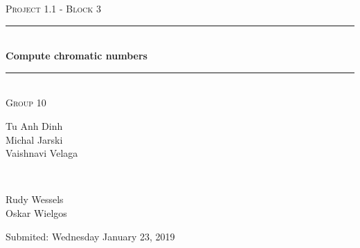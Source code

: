 \documentclass[a4paper]{report}
\begin{document}
	\begin{titlepage} 
		\newcommand{\HRule}{\rule{\linewidth}{0.5mm}}
		
		\center 
		
		\textsc{\large Project 1.1 - Block 3}\\[0.5cm] 
		
		\HRule\\[0.4cm]
		
		{\huge\bfseries Compute chromatic numbers}\\[0.4cm] 
		
		\HRule\\[1.5cm]
		
		\textsc{\large Group 10}\\[0.5cm]

		\begin{minipage}{0.6\textwidth}
			\begin{flushleft}
				Tu Anh Dinh\\Michal Jarski\\Vaishnavi Velaga
			\end{flushleft}
		\end{minipage}
		~
		\begin{minipage}{0.3\textwidth}
			\begin{flushleft}
				Rudy Wessels\\Oskar Wielgos\\
			\end{flushleft}
		\end{minipage}
		
		\vspace{2cm}
		
		Submited: Wednesday January 23, 2019
		
		
	\end{titlepage}
	
	
	
	
	
\end{document}
